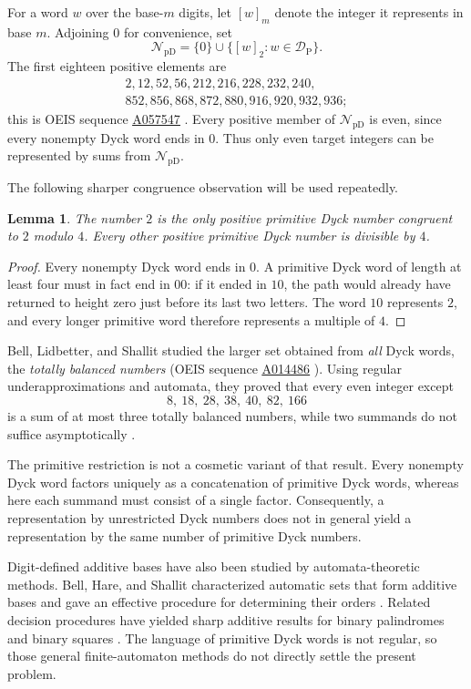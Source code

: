 \documentclass[12pt]{article}
\theoremstyle{plain}
\newtheorem{lemma}[theorem]{Lemma}
\newcommand{\val}[2]{[#1]_{#2}}
\newcommand{\NpD}{\mathcal{N}_{\mathrm{pD}}}
\newcommand{\DP}{\mathcal{D}_{\mathrm{P}}}
\newcommand{\seqnum}[1]{\href{https://oeis.org/#1}{\rm \underline{#1}}}
\begin{document}
For a word $w$ over the base-$m$ digits, let $\val{w}{m}$ denote the
integer it represents in base $m$.  Adjoining $0$ for convenience, set
\[
 \NpD=\{0\}\cup\{\val{w}{2}:w\in\DP\}.
\]
The first eighteen positive elements are
\[
\begin{gathered}
2,12,52,56,212,216,228,232,240,\\
852,856,868,872,880,916,920,932,936;
\end{gathered}
\]
this is OEIS sequence \seqnum{A057547} \cite{OEIS-A057547}.  Every positive member of
$\NpD$ is even, since every nonempty Dyck word ends in $0$.  Thus only
even target integers can be represented by sums from $\NpD$.

The following sharper congruence observation will be used repeatedly.

\begin{lemma}\label{lem:mod4}
The number $2$ is the only positive primitive Dyck number congruent to
$2$ modulo $4$.  Every other positive primitive Dyck number is divisible
by $4$.
\end{lemma}

\begin{proof}
Every nonempty Dyck word ends in $0$.  A primitive Dyck word of length at
least four must in fact end in $00$: if it ended in $10$, the path would
already have returned to height zero just before its last two letters.
The word $10$ represents $2$, and every longer primitive word therefore
represents a multiple of $4$.
\end{proof}

Bell, Lidbetter, and Shallit studied the larger set obtained from
\emph{all} Dyck words, the \emph{totally balanced numbers} (OEIS sequence
\seqnum{A014486} \cite{OEIS-A014486}).  Using regular underapproximations and automata,
they proved that every even integer except
\[
        8,\ 18,\ 28,\ 38,\ 40,\ 82,\ 166
\]
is a sum of at most three totally balanced numbers, while two summands
do not suffice asymptotically \cite[Thm.\ 14]{BLS}.

The primitive restriction is not a cosmetic variant of that result.
Every nonempty Dyck word factors uniquely as a concatenation of
primitive Dyck words, whereas here each summand must consist of a single
factor.  Consequently, a representation by unrestricted Dyck numbers
does not in general yield a representation by the same number of
primitive Dyck numbers.

Digit-defined additive bases have also been studied by automata-theoretic
methods.  Bell, Hare, and Shallit characterized automatic sets that form
additive bases and gave an effective procedure for determining their
orders \cite{BHS}.  Related decision procedures have yielded sharp
additive results for binary palindromes \cite{RSS} and binary squares
\cite{MNRS}.  The language of primitive Dyck words is not regular, so
those general finite-automaton methods do not directly settle the
present problem.
\end{document}
